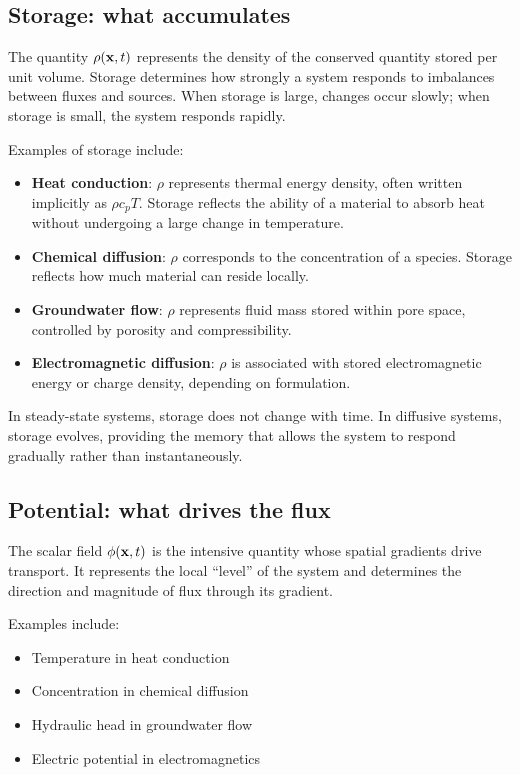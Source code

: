 \subsection{Storage: what accumulates}

The quantity $\rho(\vb{x},t)$ represents the density of the conserved quantity stored per unit volume. Storage determines how strongly a system responds to imbalances between fluxes and sources. When storage is large, changes occur slowly; when storage is small, the system responds rapidly.

Examples of storage include:
\begin{itemize}
    \item \textbf{Heat conduction}: $\rho$ represents thermal energy density, often
    written implicitly as $\rho c_p T$. Storage reflects the ability of a material
    to absorb heat without undergoing a large change in temperature.
    \item \textbf{Chemical diffusion}: $\rho$ corresponds to the concentration of a
    species. Storage reflects how much material can reside locally.
    \item \textbf{Groundwater flow}: $\rho$ represents fluid mass stored within pore
    space, controlled by porosity and compressibility.
    \item \textbf{Electromagnetic diffusion}: $\rho$ is associated with stored
    electromagnetic energy or charge density, depending on formulation.
\end{itemize}

In steady-state systems, storage does not change with time. In diffusive systems, storage evolves, providing the memory that allows the system to respond gradually rather than instantaneously.

\subsection{Potential: what drives the flux}

The scalar field $\phi(\vb{x},t)$ is the intensive quantity whose spatial gradients drive transport. It represents the local “level” of the system and determines the direction and magnitude of flux through its gradient.

Examples include:
\begin{itemize}
    \item Temperature in heat conduction
    \item Concentration in chemical diffusion
    \item Hydraulic head in groundwater flow
    \item Electric potential in electromagnetics
\end{itemize}

